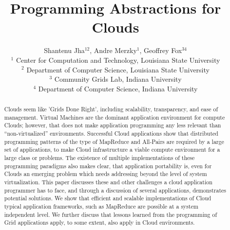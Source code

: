 \documentclass{article}
\begin{document}
\title{\large Programming Abstractions for Clouds}

\author{Shantenu Jha$^{12}$,
        Andre Merzky$^{1}$,
        Geoffrey Fox$^{34}$\\[1em]
        $^1$ \small
          Center for Computation and Technology, 
          Louisiana State University\\[-0.3em]
        $^2$ \small
          Department of Computer Science, 
          Louisiana State University\\[-0.3em]
        $^3$ \small
          Community Grids Lab, 
          Indiana University\\[-0.3em]
        $^4$ \small
          Department of Computer Science, 
          Indiana University
       }

\maketitle

\begin{abstract}

  \noindent

  Clouds seem like 'Grids Done Right', including scalability,
  transparency, and ease of management. Virtual Machines are the
  dominant application environment for compute Clouds; however, that
  does not make application programming any less relevant than
  ``non-virtualized'' environments.  Successful Cloud applications
  show that distributed programming patterns of the type of
  MapReduce and All-Pairs are required by a large set of applications,
  to make Cloud infrastructure a viable compute environment for a
  large class or problems.  The existence of multiple implementations
  of these programming paradigms also makes clear, that application
  portability is, even for Clouds an emerging problem which needs
  addressing beyond the level of system virtualization. %
  This paper discusses these and other challenges a cloud application
  programmer has to face, and through a discussion of several
  applications, demonstrates potential solutions. We show that
  efficient and scalable implementations of Cloud typical application
  frameworks, such as MapReduce are possible at a system independent
  level.  We further discuss that lessons learned from the programming
  of Grid applications apply, to some extent, also apply in Cloud
  environments.

\end{abstract}
\end{document}
